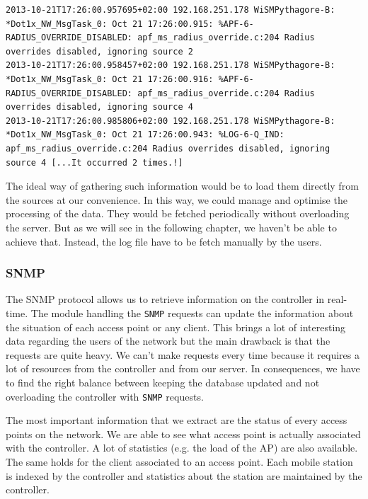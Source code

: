 \begin{lstlisting}[frame=single,breaklines=true,caption={Example of useless WiSM logs}]
2013-10-21T17:26:00.957695+02:00 192.168.251.178 WiSMPythagore-B: *Dot1x_NW_MsgTask_0: Oct 21 17:26:00.915: %APF-6-RADIUS_OVERRIDE_DISABLED: apf_ms_radius_override.c:204 Radius overrides disabled, ignoring source 2 
2013-10-21T17:26:00.958457+02:00 192.168.251.178 WiSMPythagore-B: *Dot1x_NW_MsgTask_0: Oct 21 17:26:00.916: %APF-6-RADIUS_OVERRIDE_DISABLED: apf_ms_radius_override.c:204 Radius overrides disabled, ignoring source 4 
2013-10-21T17:26:00.985806+02:00 192.168.251.178 WiSMPythagore-B: *Dot1x_NW_MsgTask_0: Oct 21 17:26:00.943: %LOG-6-Q_IND: apf_ms_radius_override.c:204 Radius overrides disabled, ignoring source 4 [...It occurred 2 times.!]
\end{lstlisting}

The ideal way of gathering such information would be to load them directly from the sources at our convenience. In this way, we could manage and optimise the processing of the data. They would be fetched periodically without overloading the server. But as we will see in the following chapter, we haven't be able to achieve that. Instead, the log file have to be fetch manually by the users.

\subsubsection{SNMP}
The SNMP protocol allows us to retrieve information on the controller in real-time. The module handling the \texttt{SNMP} requests can update the information about the situation of each access point or any client. This brings a lot of interesting data regarding the users of the network but the main drawback is that the requests are quite heavy. We can't make requests every time because it requires a lot of resources from the controller and from our server. In consequences, we have to find the right balance between keeping the database updated and not overloading the controller with \texttt{SNMP} requests. 

The most important information that we extract are the status of every access points on the network. We are able to see what access point is actually associated with the controller. A lot of statistics (e.g. the load of the AP) are also available. The same holds for the client associated to an access point. Each mobile station is indexed by the controller and statistics about the station are maintained by the controller.

